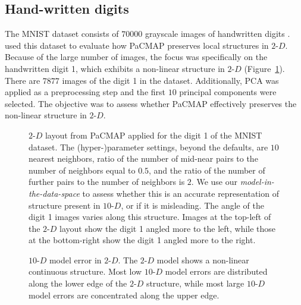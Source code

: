 \documentclass[
  12pt]{article}
\newcommand\gD{$2\text{-}D$}
\begin{document}
\subsection{Hand-written digits}\label{hand-written-digits}

The MNIST dataset consists of \(70000\) grayscale images of handwritten
digits \citep{lecun2010}. \citet{yingfan2021} used this dataset to
evaluate how PaCMAP preserves local structures in \gD{}. Because of the
large number of images, the focus was specifically on the handwritten
digit 1, which exhibits a non-linear structure in \gD{}
(Figure~\ref{fig-pacmap-author}). There are \(7877\) images of the digit
1 in the dataset. Additionally, PCA was applied as a preprocessing step
and the first \(10\) principal components were selected. The objective
was to assess whether PaCMAP effectively preserves the non-linear
structure in \gD{}.

\begin{figure}[H]


\caption{\label{fig-pacmap-author}\(2\text{-}D\) layout from PaCMAP
applied for the digit 1 of the MNIST dataset. The (hyper-)parameter
settings, beyond the defaults, are \(10\) nearest neighbors, ratio of
the number of mid-near pairs to the number of neighbors equal to
\(0.5\), and the ratio of the number of further pairs to the number of
neighbors is \(2\). We use our \emph{model-in-the-data-space} to assess
whether this is an accurate representation of structure present in
\(10\text{-}D\), or if it is misleading. The angle of the digit 1 images
varies along this structure. Images at the top-left of the
\(2\text{-}D\) layout show the digit 1 angled more to the left, while
those at the bottom-right show the digit 1 angled more to the right.}

\end{figure}%

\begin{figure}[H]


\caption{\label{fig-model-mnist}\(10\text{-}D\) model error in
\(2\text{-}D\). The \(2\text{-}D\) model shows a non-linear continuous
structure. Most low \(10\text{-}D\) model errors are distributed along
the lower edge of the \(2\text{-}D\) structure, while most large
\(10\text{-}D\) model errors are concentrated along the upper edge.}

\end{figure}%
\end{document}
